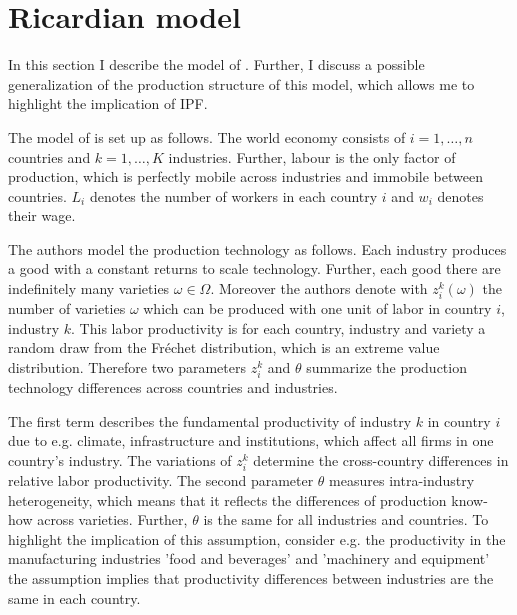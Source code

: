 \section{Ricardian model}
\label{sec:Ricardo}
In this section I  describe the model of \textcite{costinot}. Further,  I discuss a possible generalization of the production structure of this model, which allows me to highlight the implication of IPF. \par

The model of \textcite{costinot} is set up as follows.
The world economy consists of  $i = 1, \dots, n$ countries and $k = 1, \dots , K $ industries. Further, labour is the only factor of production, which is perfectly mobile across industries and immobile between countries. $L_i $ denotes the number of workers in each country $i$  and $ w_i $ denotes their wage. \par %

The authors model the production technology as follows.
Each industry produces a good with a constant returns to scale technology.
Further, each good there are indefinitely many varieties $\omega \in \Omega$. Moreover the authors denote with $z^k_i(\omega)$ the number of varieties $\omega$ which can be produced with one unit of labor in country $i$, industry $k$. This labor productivity is for each country, industry and variety a random draw from the Fr{\'e}chet distribution, which is an extreme value distribution. Therefore two parameters $z^k_{i}$ and $\theta$ summarize the  production technology differences across countries and industries. \par

The first term describes the fundamental productivity of industry $k$ in country $i$ due to e.g. climate, infrastructure and institutions, which affect all firms in one country's industry. The variations of $z^k_i$ determine the cross-country differences in relative labor productivity. The second parameter $\theta$ measures intra-industry heterogeneity, which means that it reflects the differences of production know-how across varieties.  Further, $\theta$ is the same for all industries and countries. To highlight the implication of this assumption,
consider e.g. the productivity in the manufacturing industries 'food and beverages' and 'machinery and equipment'  the assumption implies that  productivity differences between industries are the same in each country.\par %

